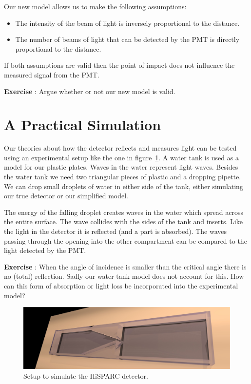 \documentclass[12pt,a4paper]{article}
\numberwithin{equation}{section}
\numberwithin{figure}{section}
\newcounter{Exercise}
\numberwithin{table}{section}
\begin{document}
Our new model allows us to make the following assumptions:
\begin{itemize}
\item The intensity of the beam of light is inversely proportional to the distance.
\item The number of beams of light that can be detected by the PMT is directly proportional to the distance.
\end{itemize}
If both assumptions are valid then the point of impact does not influence the measured signal from the PMT.

\begin{shaded}
\textbf{Exercise \theExercise {}} : Argue whether or not our new model is valid.\end{shaded}

\section{A Practical Simulation}
Our theories about how the detector reflects and measures light can be tested using an experimental setup like the one in figure~\ref{fig:exp_setup}. A water tank is used as a model for our plastic plates. Waves in the water represent light waves. Besides the water tank we need two triangular pieces of plastic and a dropping pipette. We can drop small droplets of water in either side of the tank, either simulating our true detector or our simplified model.

The energy of the falling droplet creates waves in the water which spread across the entire surface. The wave collides with the sides of the tank and inserts. Like the light in the detector it is reflected (and a part is absorbed). The waves passing through the opening into the other compartment can be compared to the light detected by the PMT.

\begin{shaded}
\textbf{Exercise \theExercise {}} : When the angle of incidence is smaller than the critical angle there is no (total) reflection. Sadly our water tank model does not account for this. How can this form of absorption or light loss be incorporated into the experimental model? \end{shaded}

\begin{figure}[h]\begin{center}
\includegraphics[scale=0.22]{simulatie4.eps}
\caption{Setup to simulate the HiSPARC detector.}\label{fig:exp_setup}
\end{center}\end{figure}
\end{document}
